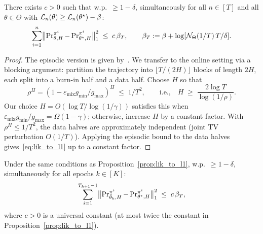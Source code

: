 \begin{prop}\label{prop:lik_to_l1}
There exists $c>0$ such that w.p.\ $\ge 1-\delta$, simultaneously for all $n\in[T]$ and all $\theta\in\Theta$ with ${\mathcal{L}}_n(\theta)\ge{\mathcal{L}}_n(\theta^\star)-\beta$:
\begin{equation}\label{eq:lik_to_l1}
\sum_{i=1}^{n}\bigl\|\operatorname{Pr}_{\theta,H}^{\pi^i}-\operatorname{Pr}_{\theta^\star,H}^{\pi^i}\bigr\|_1^2
\;\le\;
c\,\beta_T,
\qquad
\beta_T:=\beta+\log[{\mathcal{N}}_\Theta(1/T)\,T/\delta].
\end{equation}
\end{prop}

\begin{proof}
The episodic version is given by~\citet[Prop.~B.2]{liu2023optimistic}. We transfer to the online setting via a blocking argument: partition the trajectory into $\lfloor T/(2H)\rfloor$ blocks of length $2H$, each split into a burn-in half and a data half. Choose $H$ so that
\[
\rho^H = (1-\varepsilon_{\mathrm{mix}}g_{\min}/g_{\max})^H \;\le\; 1/T^2,
\qquad\text{i.e.,}\quad
H \;\ge\; \frac{2\log T}{\log(1/\rho)}.
\]
Our choice $H=O(\log T/\log(1/\gamma))$ satisfies this when $\varepsilon_{\mathrm{mix}}g_{\min}/g_{\max}=\Omega(1-\gamma)$; otherwise, increase $H$ by a constant factor. With $\rho^H\le 1/T^2$, the data halves are approximately independent (joint TV perturbation $O(1/T)$). Applying the episodic bound to the data halves gives~\eqref{eq:lik_to_l1} up to a constant factor.
\end{proof}

\begin{cor}\label{cor:epoch_mle}
Under the same conditions as Proposition~\ref{prop:lik_to_l1}, w.p.\ $\ge 1-\delta$, simultaneously for all epochs $k\in[K]$:
\begin{equation}\label{eq:hist_l1}
\sum_{i=1}^{T_{k+1}-1}\bigl\|\operatorname{Pr}_{\bar\theta_k,H}^{\pi^i}-\operatorname{Pr}_{\theta^\star,H}^{\pi^i}\bigr\|_1^2
\;\le\;c\,\beta_T,
\end{equation}
where $c>0$ is a universal constant (at most twice the constant in Proposition~\ref{prop:lik_to_l1}).
\end{cor}

